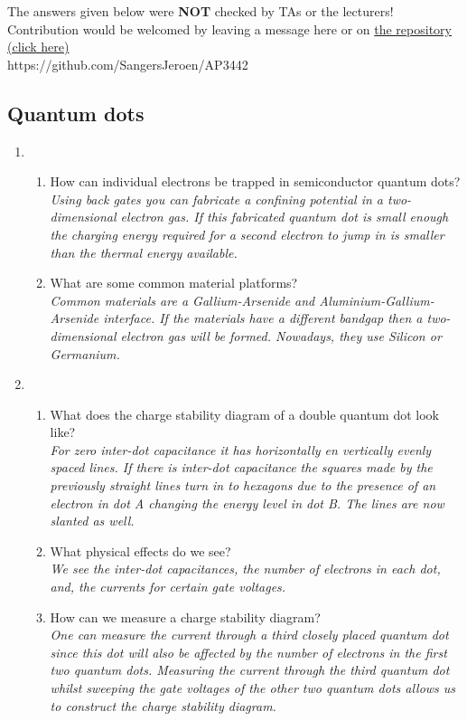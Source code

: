 \documentclass[a4paper]{scrartcl}
\newcommand{\qa}[2]{#1\\ \textit{#2}}
\begin{document}
{\color{blue} The answers given below were \textbf{NOT} checked by TAs or the lecturers!\\
Contribution would be welcomed by leaving a message here or on \href{https://github.com/SangersJeroen/AP3442}{ the repository (click here)}\\
https://github.com/SangersJeroen/AP3442}

\subsection*{Quantum dots}
\begin{enumerate}[label=(\alph*)]
  \item \begin{enumerate}[label=(\roman*)]
    \item \qa{How can individual electrons be trapped in semiconductor quantum dots?}{Using back gates you can fabricate a confining potential in a two-dimensional electron gas. If this fabricated quantum dot is small enough the charging energy required for a second electron to jump in is smaller than the thermal energy available.}
    \item \qa{What are some common material platforms?}{Common materials are a Gallium-Arsenide and Aluminium-Gallium-Arsenide interface. If the materials have a different bandgap then a two-dimensional electron gas will be formed. Nowadays, they use Silicon or Germanium.}
  \end{enumerate}

  \item \begin{enumerate}[label=(\roman*)]
    \item \qa{What does the charge stability diagram of a double quantum dot look like?}{For zero inter-dot capacitance it has horizontally en vertically evenly spaced lines. If there is inter-dot capacitance the squares made by the previously straight lines turn in to hexagons due to the presence of an electron in dot A changing the energy level in dot B. The lines are now slanted as well.}
    \item \qa{What physical effects do we see?}{We see the inter-dot capacitances, the number of electrons in each dot, and, the currents for certain gate voltages.}
    \item \qa{How can we measure a charge stability diagram?}{One can measure the current through a third closely placed quantum dot since this dot will also be affected by the number of electrons in the first two quantum dots. Measuring the current through the third quantum dot whilst sweeping the gate voltages of the other two quantum dots allows us to construct the charge stability diagram.}
  \end{enumerate}


\end{enumerate}
\end{document}
